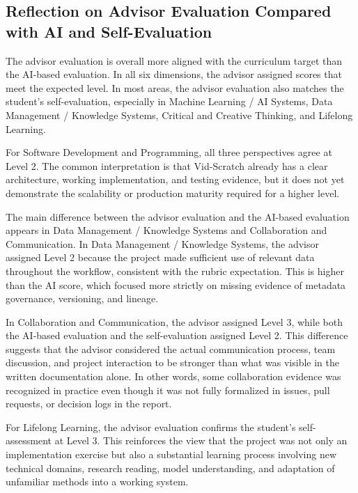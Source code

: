 \subsection{Reflection on Advisor Evaluation Compared with AI and Self-Evaluation}
\label{subsection:advisor-evaluation-reflection}

The advisor evaluation is overall more aligned with the curriculum
target than the AI-based evaluation. In all six dimensions, the
advisor assigned scores that meet the expected level. In most areas,
the advisor evaluation also matches the student's self-evaluation,
especially in Machine Learning / AI Systems, Data Management /
Knowledge Systems, Critical and Creative Thinking, and Lifelong
Learning.

For Software Development and Programming, all three perspectives agree
at Level 2. The common interpretation is that Vid-Scratch already has
a clear architecture, working implementation, and testing evidence,
but it does not yet demonstrate the scalability or production
maturity required for a higher level.

The main difference between the advisor evaluation and the AI-based
evaluation appears in Data Management / Knowledge Systems and
Collaboration and Communication. In Data Management / Knowledge
Systems, the advisor assigned Level 2 because the project made
sufficient use of relevant data throughout the workflow, consistent
with the rubric expectation. This is higher than the AI score, which
focused more strictly on missing evidence of metadata governance,
versioning, and lineage.

In Collaboration and Communication, the advisor assigned Level 3,
while both the AI-based evaluation and the self-evaluation assigned
Level 2. This difference suggests that the advisor considered the
actual communication process, team discussion, and project interaction
to be stronger than what was visible in the written documentation
alone. In other words, some collaboration evidence was recognized in
practice even though it was not fully formalized in issues, pull
requests, or decision logs in the report.

For Lifelong Learning, the advisor evaluation confirms the student's
self-assessment at Level 3. This reinforces the view that the project
was not only an implementation exercise but also a substantial
learning process involving new technical domains, research reading,
model understanding, and adaptation of unfamiliar methods into a
working system.

